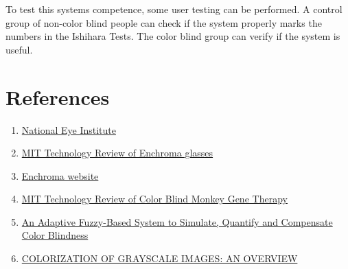 \documentclass[12pt]{article}
\begin{document}
 To test this systems competence, some user testing can be performed. A control group of non-color blind people can check if the system properly marks the numbers in the Ishihara Tests. The color blind group can verify if the system is useful.

\section{References}
\singlespacing
\begin{enumerate}
	\item 
		\href{https://nei.nih.gov/health/color_blindness/facts_about}{National Eye Institute}

	\item
		\href{https://www.technologyreview.com/s/601782/how-enchromas-glasses-correct-color-blindness/}{MIT Technology Review of Enchroma glasses}
	
	\item
		\href{http://enchroma.com/contact-us/}{Enchroma website}
		
	\item
		\href{https://www.technologyreview.com/s/415339/color-blind-monkeys-get-full-color-vision/}{MIT Technology Review of Color Blind Monkey Gene Therapy}
		
	\item
		\href{https://arxiv.org/abs/1711.10662}{An Adaptive Fuzzy-Based System to Simulate, Quantify and Compensate Color Blindness}
		
	\item
		\href{https://pdfs.semanticscholar.org/e9e7/d61430c6438fc52031111e48f1224e14fa5a.pdf}{COLORIZATION OF GRAYSCALE IMAGES: AN OVERVIEW}

\end{enumerate}
\end{document}
